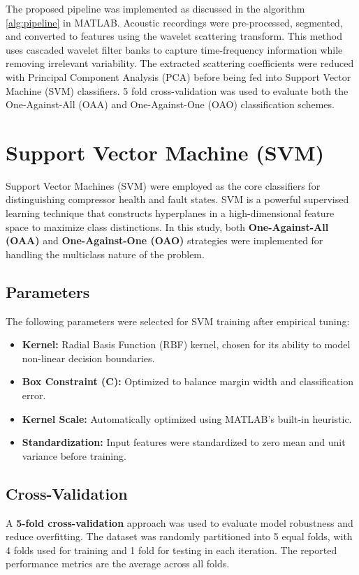 \documentclass[12pt,a4paper]{article}
\begin{document}
\begin{multicols}{2}
The proposed pipeline was implemented as discussed in the algorithm \ref{alg:pipeline} in MATLAB.  Acoustic recordings were pre-processed, segmented, and converted to features using the wavelet scattering transform.  This method uses cascaded wavelet filter banks to capture time-frequency information while removing irrelevant variability.  The extracted scattering coefficients were reduced with Principal Component Analysis (PCA) before being fed into Support Vector Machine (SVM) classifiers. 5 fold cross-validation was used to evaluate both the One-Against-All (OAA) and One-Against-One (OAO) classification schemes.




\section{Support Vector Machine (SVM)}
\label{sec:classification}


Support Vector Machines (SVM) were employed as the core classifiers for distinguishing compressor health and fault states. SVM is a powerful supervised learning technique that constructs hyperplanes in a high-dimensional feature space to maximize class distinctions. In this study, both \textbf{One-Against-All (OAA)} and \textbf{One-Against-One (OAO)} strategies were implemented for handling the multiclass nature of the problem.

\subsection*{Parameters}
The following parameters were selected for SVM training after empirical tuning:
\begin{itemize}
    \item \textbf{Kernel:} Radial Basis Function (RBF) kernel, chosen for its ability to model non-linear decision boundaries.
    \item \textbf{Box Constraint (C):} Optimized to balance margin width and classification error.
    \item \textbf{Kernel Scale:} Automatically optimized using MATLAB’s built-in heuristic.
    \item \textbf{Standardization:} Input features were standardized to zero mean and unit variance before training.
\end{itemize}

\subsection{Cross-Validation}
A \textbf{5-fold cross-validation} approach was used to evaluate model robustness and reduce overfitting. The dataset was randomly partitioned into 5 equal folds, with 4 folds used for training and 1 fold for testing in each iteration. The reported performance metrics are the average across all folds.


\end{multicols}
\end{document}
